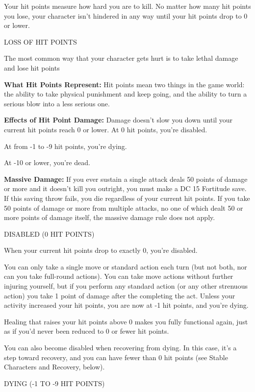 \documentclass{article}
\begin{document}
Your hit points measure how hard you are to kill. No matter how many hit points 
you lose, your character isn't hindered in any way until your hit points drop to 
0 or lower.

\vspace{12pt}
LOSS OF HIT POINTS

The most common way that your character gets hurt is to take lethal damage and 
lose hit points

\textbf{What Hit Points Represent:} Hit points mean two things in the game world: 
the ability to take physical punishment and keep going, and the ability to turn 
a serious blow into a less serious one.

\textbf{Effects of Hit Point Damage:} Damage doesn't slow you down until your current 
hit points reach 0 or lower. At 0 hit points, you're disabled.

At from -1 to -9 hit points, you're dying.

At -10 or lower, you're dead.

\textbf{Massive Damage: }If you ever sustain a single attack deals 50 points of 
damage or more and it doesn't kill you outright, you must make a DC 15 Fortitude 
save. If this saving throw fails, you die regardless of your current hit points. 
If you take 50 points of damage or more from multiple attacks, no one of which 
dealt 50 or more points of damage itself, the massive damage rule does not apply.

\vspace{12pt}
DISABLED (0 HIT POINTS)

When your current hit points drop to exactly 0, you're disabled.

You can only take a single move or standard action each turn (but not both, nor 
can you take full-round actions). You can take move actions without further injuring 
yourself, but if you perform any standard action (or any other strenuous action) 
you take 1 point of damage after the completing the act. Unless your activity increased 
your hit points, you are now at -1 hit points, and you're dying.

Healing that raises your hit points above 0 makes you fully functional again, just 
as if you'd never been reduced to 0 or fewer hit points.

You can also become disabled when recovering from dying. In this case, it's a step 
toward recovery, and you can have fewer than 0 hit points (see Stable Characters 
and Recovery, below).

\vspace{12pt}
DYING (-1 TO -9 HIT POINTS)
\end{document}
